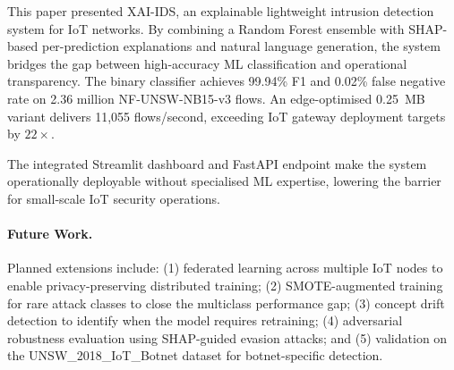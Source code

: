 \documentclass[12pt,a4paper]{article}
\begin{document}
This paper presented XAI-IDS, an explainable lightweight intrusion detection system
for IoT networks. By combining a Random Forest ensemble with SHAP-based per-prediction
explanations and natural language generation, the system bridges the gap between
high-accuracy ML classification and operational transparency. The binary classifier
achieves 99.94\% F1 and 0.02\% false negative rate on 2.36 million NF-UNSW-NB15-v3
flows. An edge-optimised 0.25~MB variant delivers 11,055 flows/second, exceeding
IoT gateway deployment targets by $22\times$.

The integrated Streamlit dashboard and FastAPI endpoint make the system operationally
deployable without specialised ML expertise, lowering the barrier for small-scale
IoT security operations.

\paragraph{Future Work.}
Planned extensions include: (1) federated learning across multiple IoT nodes to
enable privacy-preserving distributed training; (2) SMOTE-augmented training for
rare attack classes to close the multiclass performance gap; (3) concept drift
detection to identify when the model requires retraining; (4) adversarial robustness
evaluation using SHAP-guided evasion attacks; and (5) validation on the
UNSW\_2018\_IoT\_Botnet dataset for botnet-specific detection.

\newpage


\end{document}
